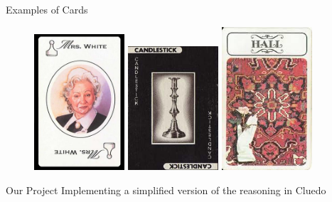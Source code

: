 \begin{frame}{Examples of Cards}
	\begin{figure}[h]
		\centering
		\includegraphics[width=0.3\textwidth]{images/cluewhite.jpg}
		\hfill
		\includegraphics[width=0.3\textwidth]{images/CandleStick.jpg}
		\hfill
		\includegraphics[width=0.3\textwidth]{images/hall.jpg}
		\label{fig:game}
	\end{figure}
\end{frame}

\begin{frame}{Our Project}
	Implementing a simplified version of the reasoning in Cluedo
\end{frame}